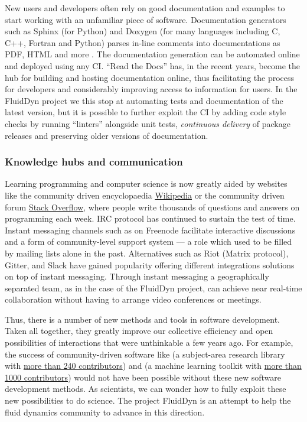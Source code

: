 New users and developers often rely on good documentation and examples to start
working with an unfamiliar piece of software. Documentation generators such as
Sphinx (for Python) and Doxygen (for many languages including C, C++, Fortran
and Python) parses in-line comments into documentations as PDF, HTML and more
\citep{lee_ten_2018}. The documentation generation can be automated online and
deployed using any CI. ``Read the Docs'' has, in the recent years, become the
hub for building and hosting documentation online, thus facilitating the
process for developers and considerably improving access to information for
users.
%
In the FluidDyn project we this stop at automating tests and documentation of
the latest version, but it is possible to further exploit the CI by adding code
style checks by running ``linters'' alongside unit tests, \emph{continuous
delivery} of package releases and preserving older versions of documentation.

\subsubsection{Knowledge hubs and communication}

%
Learning programming and computer science is now greatly aided by websites like
the community driven encyclopaedia \href{https://www.wikipedia.org/}{Wikipedia}
or the community driven forum \href{https://stackoverflow.com/}{Stack
Overflow}, where people write thousands of questions and answers on programming
each week. IRC protocol has continued to sustain the test of time. Instant
messaging channels such as  on Freenode facilitate
interactive discussions and a form of community-level support system --- a role
which used to be filled by mailing lists alone in the past. Alternatives such
as Riot (Matrix protocol), Gitter, and Slack have gained popularity offering
different integrations solutions on top of instant messaging.
%
Through instant messaging a geographically separated team, as in the case of
the FluidDyn project, can achieve near real-time collaboration without having
to arrange video conferences or meetings.

Thus, there is a number of new methods and tools in software development.
Taken all together, they greatly improve our collective efficiency and
open possibilities of interactions that were unthinkable a few years ago.
%
For example, the success of community-driven software like  (a
subject-area research library with
\href{https://github.com/astropy/astropy}{more than 240 contributors}) and
 (a machine learning toolkit with
\href{https://github.com/scikit-learn/scikit-learn}{more than 1000
contributors}) would not have been possible without these new software
development methods.
%
As scientists, we can wonder how to fully exploit these new possibilities to do
science.  The project FluidDyn is an attempt to help the fluid dynamics
community to advance in this direction.


